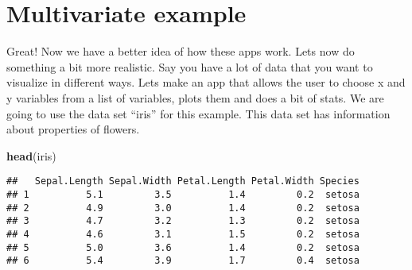 \documentclass[]{article}
\newenvironment{Shaded}{\begin{snugshade}}{\end{snugshade}}
\newcommand{\CommentTok}[1]{\textcolor[rgb]{0.56,0.35,0.01}{\textit{#1}}}
\newcommand{\DataTypeTok}[1]{\textcolor[rgb]{0.13,0.29,0.53}{#1}}
\newcommand{\KeywordTok}[1]{\textcolor[rgb]{0.13,0.29,0.53}{\textbf{#1}}}
\newcommand{\NormalTok}[1]{#1}
\newcommand{\StringTok}[1]{\textcolor[rgb]{0.31,0.60,0.02}{#1}}
\begin{document}
\begin{Shaded}
\end{Shaded}

\hypertarget{multivariate-example}{%
\section{Multivariate example}\label{multivariate-example}}

Great! Now we have a better idea of how these apps work. Lets now do
something a bit more realistic. Say you have a lot of data that you want
to visualize in different ways. Lets make an app that allows the user to
choose x and y variables from a list of variables, plots them and does a
bit of stats. We are going to use the data set ``iris'' for this
example. This data set has information about properties of flowers.

\begin{Shaded}
\begin{Highlighting}[]
\KeywordTok{head}\NormalTok{(iris)}
\end{Highlighting}
\end{Shaded}

\begin{verbatim}
##   Sepal.Length Sepal.Width Petal.Length Petal.Width Species
## 1          5.1         3.5          1.4         0.2  setosa
## 2          4.9         3.0          1.4         0.2  setosa
## 3          4.7         3.2          1.3         0.2  setosa
## 4          4.6         3.1          1.5         0.2  setosa
## 5          5.0         3.6          1.4         0.2  setosa
## 6          5.4         3.9          1.7         0.4  setosa
\end{verbatim}
\end{document}
